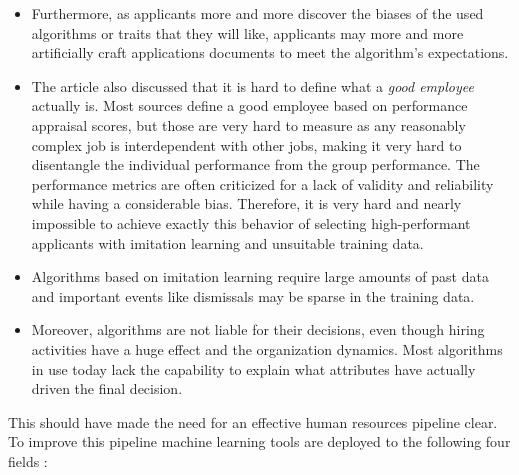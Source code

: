 \documentclass[draft,final]{thesisclass} %
\begin{document}
\begin{enumerate}
\begin{itemize}
        \item Furthermore, as applicants more and more discover the biases of the used algorithms or traits that they will like, applicants may more and more artificially craft applications documents to meet the algorithm's expectations.
        \item The article also discussed that it is hard to define what a \textit{good employee} actually is. Most sources define a good employee based on performance appraisal scores, but those are very hard to measure as any reasonably complex job is interdependent with other jobs, making it very hard to disentangle the individual performance from the group performance. The performance metrics are often criticized for a lack of validity and reliability while having a considerable bias. Therefore, it is very hard and nearly impossible to achieve exactly this behavior of selecting high-performant applicants with imitation learning and unsuitable training data.
        \item Algorithms based on imitation learning require large amounts of past data and important events like dismissals may be sparse in the training data.
        \item Moreover, algorithms are not liable for their decisions, even though  hiring activities have a huge effect and the organization dynamics. Most algorithms in use today lack the capability to explain what attributes have actually driven the final decision.
    \end{itemize}
\end{enumerate}
This should have made the need for an effective human resources pipeline clear. To improve this pipeline machine learning tools are deployed to the following four fields \cite[4-8]{ai_recruiting}:
\end{document}
